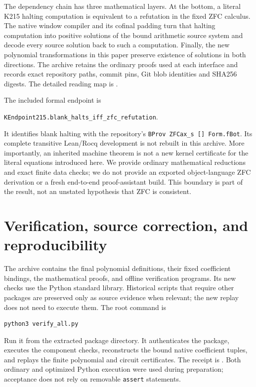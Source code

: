 \documentclass[11pt,a4paper]{article}
\numberwithin{equation}{section}
\begin{document}
The dependency chain has three mathematical layers. At the bottom,
a literal K215 halting computation is equivalent to a refutation in the
fixed ZFC calculus. The native window compiler and its cofinal padding
turn that halting computation into positive solutions of the bound
arithmetic source system and decode every source solution back to such
a computation. Finally, the new polynomial transformations in this paper
preserve existence of solutions in both directions. The archive retains
the ordinary proofs used at each interface and records exact repository
paths, commit pins, Git blob identities and SHA256 digests. The detailed
reading map is
.

The included formal endpoint is
\begin{center}
\small\texttt{KEndpoint215.blank\_halts\_iff\_zfc\_refutation}.
\end{center}
It identifies blank halting with the repository's
\texttt{BProv ZFCax\_s [] Form.fBot}. Its complete transitive Lean/Rocq
development is not rebuilt in this archive. More importantly, an inherited
machine theorem is not a new kernel certificate for the literal equations
introduced here. We provide ordinary mathematical reductions and exact
finite data checks; we do not provide an exported object-language ZFC
derivation or a fresh end-to-end proof-assistant build. This boundary is
part of the result, not an unstated hypothesis that ZFC is consistent.






\section{Verification, source correction, and reproducibility}
\label{sec:verification}

The archive contains the final polynomial definitions, their fixed
coefficient bindings, the mathematical proofs, and offline verification
programs. Its new checks use the Python standard library. Historical
scripts that require other packages are preserved only as source evidence
when relevant; the new replay does not need to execute them. The root
command is
\begin{verbatim}
python3 verify_all.py
\end{verbatim}
Run it from the extracted package directory. It authenticates the package,
executes the component checks, reconstructs the bound native coefficient
tuples, and replays the finite polynomial and circuit certificates. The
receipt is . Both ordinary and optimized
Python execution were used during preparation; acceptance does not rely
on removable \texttt{assert} statements.
\end{document}
